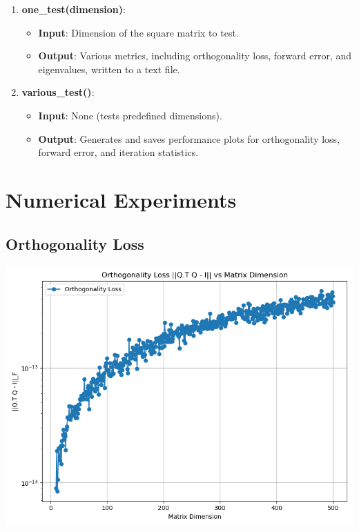 \documentclass[12pt, a4paper]{ctexart}
\begin{document}
\begin{enumerate}
    \item \textbf{one\_test(dimension)}:
    \begin{itemize}
        \item \textbf{Input}: Dimension of the square matrix to test.
        \item \textbf{Output}: Various metrics, including orthogonality loss, forward error, and eigenvalues, written to a text file.
    \end{itemize}

    \item \textbf{various\_test()}:
    \begin{itemize}
        \item \textbf{Input}: None (tests predefined dimensions).
        \item \textbf{Output}: Generates and saves performance plots for orthogonality loss, forward error, and iteration statistics.
    \end{itemize}
\end{enumerate}

\section{Numerical Experiments}


\subsection{Orthogonality Loss}

\begin{center}
    \includegraphics[scale=0.5]{orthogonality_loss.png}
\end{center}
\end{document}

